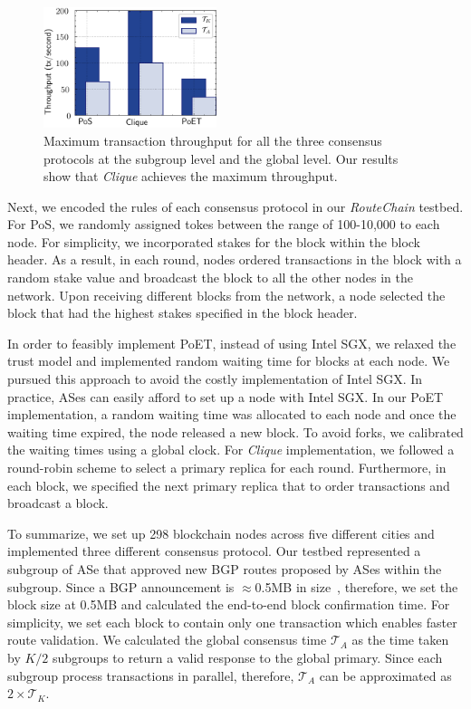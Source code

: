 \documentclass[5p]{elsarticle}
\newcommand{\rc}{{{\em RouteChain}}\xspace}
\begin{document}
{\begin{figure}[t]
\begin{center}
\includegraphics[width=0.45\textwidth]{fig/rc_two.pdf}
\caption{Maximum transaction throughput for all the three consensus protocols at the subgroup level and the global level. Our results show that {\em Clique} achieves the maximum throughput.  } 
\label{fig:simComplete}
\end{center}
\end{figure}


Next, we encoded the rules of each consensus protocol in our \rc testbed. For PoS, we randomly assigned tokes between the range of 100-10,000 to each node. For simplicity, we incorporated stakes for the block within the block header. As a result, in each round, nodes ordered transactions in the block with a random stake value and broadcast the block to all the other nodes in the network. Upon receiving different blocks from the network, a node selected the block that had the highest stakes specified in the block header. 

In order to feasibly implement PoET, instead of using Intel SGX, we relaxed the trust model and implemented random waiting time for blocks at each node. We pursued this approach to avoid the costly implementation of Intel SGX. In practice, ASes can easily afford to set up a node with Intel SGX. In our PoET implementation, a random waiting time was allocated to each node and once the waiting time expired, the node released a new block. To avoid forks, we calibrated the waiting times using a global clock. For {\em Clique} implementation, we followed a round-robin scheme to select a primary replica for each round. Furthermore, in each block, we specified the next primary replica that to order transactions and broadcast a block.  


To summarize, we set up 298 blockchain nodes across five different cities and implemented three different consensus protocol. Our testbed represented a subgroup of ASe that approved new BGP routes proposed by ASes within the subgroup. Since a BGP announcement is $\approx$0.5MB in size~\cite{BGPMTUmi97:online}, therefore, we set the block size at 0.5MB and calculated the end-to-end block confirmation time. For simplicity, we set each block to contain only one transaction which enables faster route validation. We calculated the global consensus time $\mathcal{T}_{A}$ as the time taken by $K/2$ subgroups to return a valid response to the global primary. Since each subgroup process transactions in parallel, therefore, $\mathcal{T}_{A}$ can be approximated as $2\times\mathcal{T}_{K}$.

}
\end{document}
